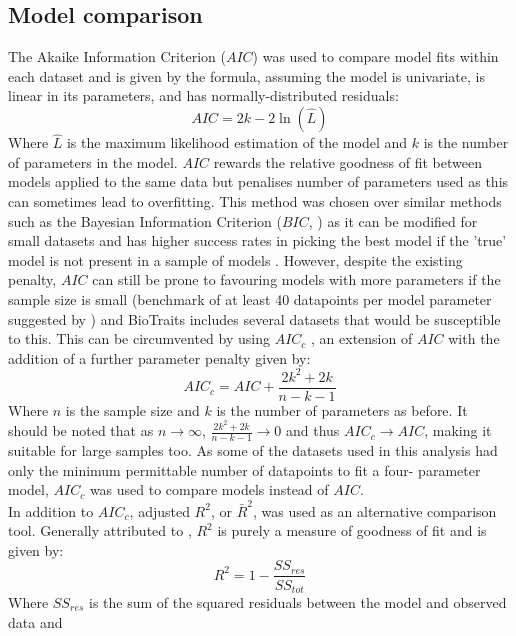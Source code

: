 \documentclass[twoside,twocolumn,11pt]{article}
\begin{document}
\subsection{Model comparison}
The Akaike Information Criterion ($AIC$) \citep{A1974} was used to compare model fits within each dataset and is 
given by the formula, assuming the model is univariate, is linear in its parameters, and has normally-distributed residuals:
\begin{equation}
  AIC = 2k - 2\ln(\hat{L})
\end{equation}
Where $\hat{L}$ is the maximum likelihood estimation of the model and $k$ is the number of parameters in the model.
$AIC$ rewards the relative goodness of fit between models applied to the same data but penalises 
number of parameters used as this can sometimes lead to overfitting.
This method was chosen over similar methods such as the Bayesian Information Criterion ($BIC$, \cite{Schwarz1978}) as it can be 
modified for small datasets and has higher success rates in picking the best model if the 'true' model is not
present in a sample of models \citep{Vrieze2012}. However, despite the existing penalty, $AIC$ can 
still be prone to favouring models with more parameters if the sample size is small (benchmark of at least 40
datapoints per model parameter suggested by \cite{Johnson2004}) and BioTraits includes several datasets that would
be susceptible to this. This can be circumvented by using $AIC_c$ \citep{Hurvich1989}, an extension of $AIC$ with
the addition of a further parameter penalty given by:
\begin{equation}
  AIC_c = AIC + \frac{2k^2 + 2k}{n-k-1}
\end{equation}
Where $n$ is the sample size and $k$ is the number of parameters as before. It should be noted that as $n \to \infty$, 
$\frac{2k^2 + 2k}{n-k-1} \to 0$ and thus $AIC_c \to AIC$, making it suitable for large samples too. 
As some of the datasets used in this analysis had only the minimum permittable number of datapoints to fit a four-
parameter model, $AIC_c$ was used to compare models instead of $AIC$.
\\
In addition to $AIC_c$, adjusted $R^2$, or $\bar{R}^2$, was used as an alternative comparison tool. Generally attributed 
to \cite{Wright1921}, $R^2$ is purely a measure of goodness of fit and is given by:
\begin{equation}
  R^2 = 1 - \frac{SS_{res}}{SS_{tot}}
\end{equation}
Where $SS_{res}$ is the sum of the squared residuals between the model and observed data and 
\end{document}
